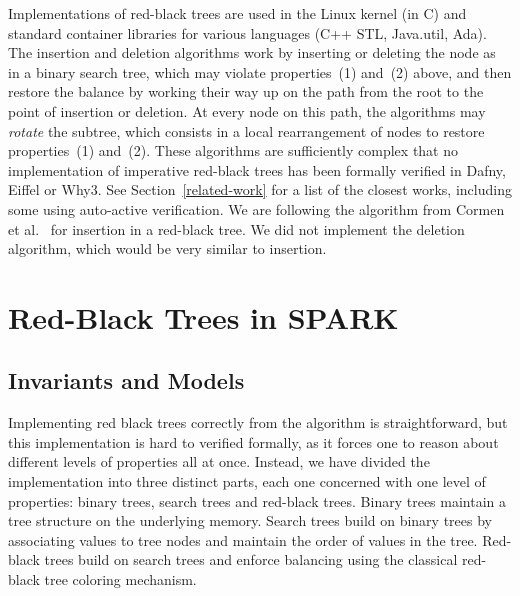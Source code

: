 \documentclass{llncs}
\newcommand{\spark}{SPARK\xspace}
\begin{document}
Implementations of red-black trees are used in the Linux kernel (in C) and
standard container libraries for various languages (C++ STL, Java.util,
Ada). The insertion and deletion algorithms work by inserting or deleting the
node as in a binary search tree, which may violate properties~(1) and~(2)
above, and then restore the balance by working their way up on the path from
the root to the point of insertion or deletion. At every node on this path, the
algorithms may \emph{rotate} the subtree, which consists in a local
rearrangement of nodes to restore properties~(1) and~(2). These algorithms are
sufficiently complex that no implementation of imperative red-black trees has
been formally verified in Dafny, Eiffel or Why3. See
Section~\ref{related-work} for a list of the closest works, including some
using auto-active verification. We are following the algorithm from Cormen et
al.~\cite{Cormen2009} for insertion in a red-black tree. We did not implement
the deletion algorithm, which would be very similar to insertion.

\section{Red-Black Trees in \spark}
\subsection{Invariants and Models}
\label{sec-rbt-inv}


Implementing red black trees correctly from the algorithm is straightforward,
but this implementation is hard to verified formally, as it forces one to
reason about different levels of properties all at once. Instead, we have
divided the implementation into three distinct parts, each one concerned with
one level of properties: binary trees, search trees and red-black trees. Binary
trees maintain a tree structure on the underlying memory. Search trees build on
binary trees by associating values to tree nodes and maintain the order of
values in the tree. Red-black trees build on search trees and enforce balancing
using the classical red-black tree coloring mechanism.
\end{document}
